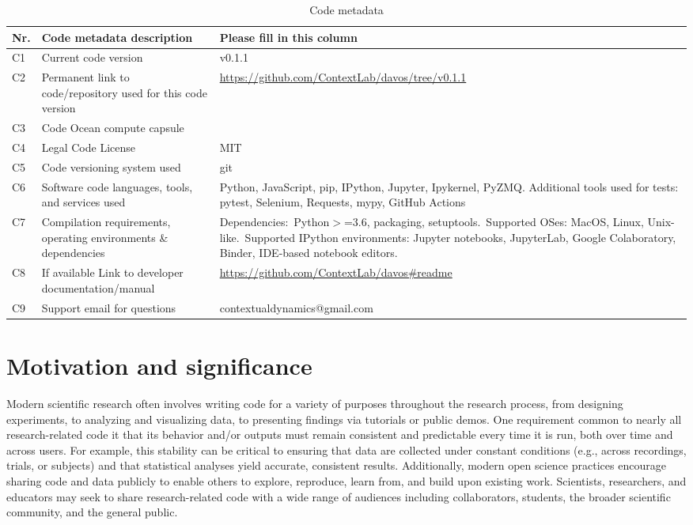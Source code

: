 \documentclass[preprint,12pt, a4paper]{elsarticle}
\begin{document}
\begin{table}[H]
\begin{tabular}{|l|p{6.5cm}|p{6.5cm}|}
\hline
\textbf{Nr.} & \textbf{Code metadata description} & \textbf{Please fill in this column} \\
\hline
C1 & Current code version &  v0.1.1 \\
\hline
C2 & Permanent link to code/repository used for this code version & \url{https://github.com/ContextLab/davos/tree/v0.1.1} \\
\hline
C3 & Code Ocean compute capsule & \\
\hline
C4 & Legal Code License & MIT \\
\hline
C5 & Code versioning system used & git \\
\hline
C6 & Software code languages, tools, and services used & Python, JavaScript, pip, IPython, Jupyter, Ipykernel, PyZMQ. Additional tools used for tests: pytest, Selenium, Requests, mypy, GitHub Actions \\
\hline
C7 & Compilation requirements, operating environments \& dependencies & Dependencies:~Python$>$=3.6, packaging, setuptools.~Supported OSes: MacOS, Linux, Unix-like.~Supported IPython environments: Jupyter notebooks, JupyterLab, Google Colaboratory, Binder, IDE-based notebook editors. \\
\hline
C8 & If available Link to developer documentation/manual & \url{https://github.com/ContextLab/davos\#readme} \\
\hline
C9 & Support email for questions & contextualdynamics@gmail.com \\
\hline
\end{tabular}
\caption{Code metadata}
\label{}
\end{table}

\linenumbers


\section{Motivation and significance}
Modern scientific research often involves writing code for a variety of purposes throughout the research process, from designing experiments, to analyzing and visualizing data, to presenting findings via tutorials or public demos. One requirement common to nearly all research-related code it that its behavior and/or outputs must remain consistent and predictable every time it is run, both over time and across users. For example, this stability can be critical to ensuring that data are collected under constant conditions (e.g., across recordings, trials, or subjects) and that statistical analyses yield accurate, consistent results. Additionally, modern open science practices encourage sharing code and data publicly to enable others to explore, reproduce, learn from, and build upon existing work. Scientists, researchers, and educators may seek to share research-related code with a wide range of audiences including collaborators, students, the broader scientific community, and the general public.
\end{document}
